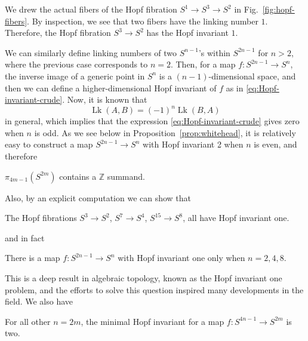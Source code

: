 \documentclass[12pt]{article}
\numberwithin{equation}{section}
\theoremstyle{remark}
\def\bZ{\mathbb{Z}}
\def\Lk{\mathop{\mathrm{Lk}}}
\begin{document}
We drew the actual fibers of the Hopf fibration $S^1\to S^3\to S^2$ in Fig.~\ref{fig:hopf-fibers}.
By inspection, we see that two fibers have the linking number $1$. 
Therefore, the Hopf fibration $S^3\to S^2$ has the Hopf invariant $1$.

We can similarly define linking numbers of two $S^{n-1}$'s within $S^{2n-1}$ for $n>2$,
where the previous case corresponds to $n=2$.
Then, for a map $f: S^{2n-1}\to S^{n}$,
the inverse image of a generic point in $S^n$ is a $(n-1)$-dimensional space,
and then we can define a higher-dimensional Hopf invariant of $f$ as in \eqref{eq:Hopf-invariant-crude}.
Now, it is known that  \begin{equation}
\Lk (A,B)=(-1)^n \Lk (B,A)
\label{eq:Lk-sym}
\end{equation} in general, which implies that the expression \eqref{eq:Hopf-invariant-crude} gives zero when $n$ is odd.
As we see below in Proposition~\ref{prop:whitehead}, 
it is relatively easy to construct a map $S^{2n-1}\to S^n$ with Hopf invariant 2 when  $n$ is even, and therefore
\begin{theorem}
  $\pi_{4m-1}(S^{2m})$ contains a  $\bZ$ summand.
\end{theorem}

Also, by an explicit computation we can show  that \begin{proposition}
The Hopf fibrations $S^3\to S^2$, $S^7\to S^4$, $S^{15}\to S^8$,
all have Hopf invariant one.
\end{proposition}
and in fact 
\begin{theorem}
There is a map $f:S^{2n-1}\to S^n$ with Hopf invariant one
only when $n=2,4,8$.
\end{theorem}
This is a deep result in algebraic topology, known as the Hopf invariant one problem,
and the efforts to solve this question inspired many developments in the field.
We also have
\begin{proposition}
\label{prop:whitehead}
For all other $n=2m$, the minimal Hopf invariant for a map $f:S^{4n-1}\to S^{2m}$ is two.
\end{proposition}
\end{document}
